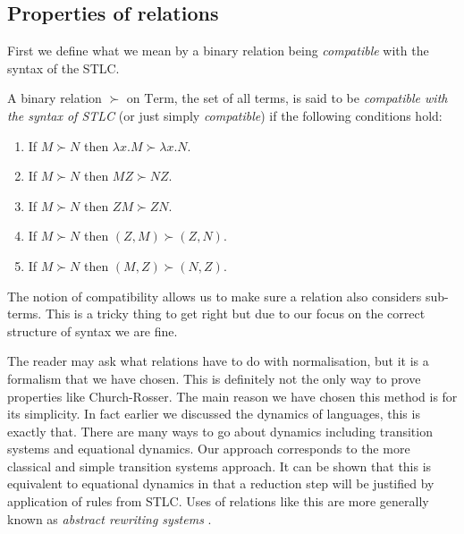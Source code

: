 \subsection{Properties of relations}

First we define what we mean by a binary relation being \emph{compatible} with the syntax of the STLC.
\begin{defin}
    A binary relation $\succ$ on $\mathrm{Term}$, the set of all terms, is said to be \emph{compatible with the syntax of STLC} (or just simply \emph{compatible}) if the following conditions hold:
    \begin{enumerate}
        \item If $M \succ N$ then $\lambda x . M \succ \lambda x . N$.
        \item If $M \succ N$ then $M Z \succ N Z$.
        \item If $M \succ N$ then $Z M \succ Z N$.
        \item If $M \succ N$ then $(Z,M) \succ (Z,N)$.
        \item If $M \succ N$ then $(M, Z) \succ (N, Z)$.
    \end{enumerate}
\end{defin}

\begin{remark}
    The notion of compatibility allows us to make sure a relation also considers sub-terms. This is a tricky thing to get right but due to our focus on the correct structure of syntax we are fine.
\end{remark}

\begin{remark}
    The reader may ask what relations have to do with normalisation, but it is a formalism that we have chosen. This is definitely not the only way to prove properties like Church-Rosser. The main reason we have chosen this method is for its simplicity. In fact earlier we discussed the dynamics of languages, this is exactly that. There are many ways to go about dynamics including transition systems and equational dynamics. Our approach corresponds to the more classical and simple transition systems approach. It can be shown that this is equivalent to equational dynamics in that a reduction step will be justified by application of rules from STLC. Uses of relations like this are more generally known as \emph{abstract rewriting systems} \cite{barendregt1984lambda, BarendregtHenk2013Lcwt}.
\end{remark}

